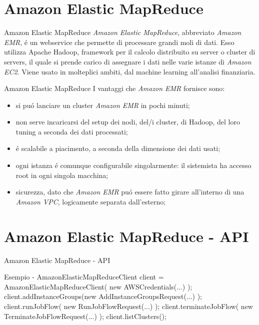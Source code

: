 \documentclass{beamer}
\begin{document}
\section{Amazon Elastic MapReduce}
\begin{frame}{Amazon Elastic MapReduce}
\emph{Amazon Elastic MapReduce}, abbreviato \emph{Amazon EMR}, \'e un webservice che permette di processare grandi moli di dati. Esso utilizza Apache Hadoop, framework per il calcolo distribuito su server o cluster di servers, il quale si prende carico di assegnare i dati nelle varie istanze di \emph{Amazon EC2}. Viene usato in molteplici ambiti, dal machine learning all'analisi finanziaria.
\end{frame}


\begin{frame}{Amazon Elastic MapReduce}
I vantaggi che \emph{Amazon EMR} fornisce sono:
\begin{itemize}
\item si pu\'o lanciare un cluster \emph{Amazon EMR} in pochi minuti;
\item non serve incaricarsi del setup dei nodi, del/i cluster, di Hadoop, del loro tuning a seconda dei dati processati;
\item \'e scalabile a piacimento, a seconda della dimensione dei dati usati;
\item ogni istanza \'e comunque configurabile singolarmente:  il sistemista ha accesso root in ogni singola macchina;
\item sicurezza, dato che \emph{Amazon EMR} pu\'o essere fatto girare all'interno di una \emph{Amazon VPC}, logicamente separata dall'esterno;
\end{itemize}
\end{frame}


\section{Amazon Elastic MapReduce - API}
\begin{frame}{Amazon Elastic MapReduce - API}
\begin{exampleblock}{Esempio - AmazonElasticMapReduceClient}
{\small
client = AmazonElasticMapReduceClient( new AWSCredentials(...) );
\newline
client.addInstanceGroups(new AddInstanceGroupsRequest(...) );
\newline
client.runJobFlow( new RunJobFlowRequest(...) );
\newline
client.terminateJobFlow( new TerminateJobFlowRequest(...) );
\newline
client.listClusters();
}
\end{exampleblock}
\end{frame}
\end{document}
